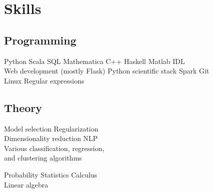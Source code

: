 \documentclass[]{deedy-resume-openfont}
\begin{document}
\begin{minipage}[t]{0.33\textwidth}


 \section{Skills}
 \subsection{Programming}
 Python \textbullet{} Scala \textbullet{} SQL \textbullet{} Mathematica
 C++ \textbullet{} Haskell \textbullet{} Matlab \textbullet{} IDL \\
 Web development (mostly Flask)
Python scientific stack \textbullet{} Spark  \textbullet{} Git \\
Linux \textbullet{} Regular expressions
\sectionsep

\subsection{Theory}
Model selection \textbullet{} Regularization \\
Dimensionality reduction \textbullet{} NLP  \\
Various classification, regression, \\
and clustering algorithms

Probability \textbullet{} Statistics \textbullet{} Calculus \\
Linear algebra



%
%

\end{minipage} 
\end{document}
